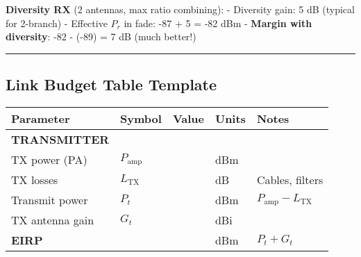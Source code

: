 \textbf{Diversity RX} (2 antennas, max ratio combining): - Diversity
gain: 5 dB (typical for 2-branch) - Effective \(P_r\) in fade: -87 + 5 =
-82 dBm - \textbf{Margin with diversity}: -82 - (-89) = 7 dB (much
better!)

\begin{center}\rule{0.5\linewidth}{0.5pt}\end{center}

\subsection{Link Budget Table
Template}\label{link-budget-table-template}

{\def\LTcaptype{} %
\begin{longtable}[]{@{}
  >{\raggedright\arraybackslash}p{}
  >{\raggedright\arraybackslash}p{}
  >{\raggedright\arraybackslash}p{}
  >{\raggedright\arraybackslash}p{}
  >{\raggedright\arraybackslash}p{}@{}}
\toprule\noalign{}
\begin{minipage}[b]{\linewidth}\raggedright
Parameter
\end{minipage} & \begin{minipage}[b]{\linewidth}\raggedright
Symbol
\end{minipage} & \begin{minipage}[b]{\linewidth}\raggedright
Value
\end{minipage} & \begin{minipage}[b]{\linewidth}\raggedright
Units
\end{minipage} & \begin{minipage}[b]{\linewidth}\raggedright
Notes
\end{minipage} \\
\midrule\noalign{}
\endhead
\bottomrule\noalign{}
\endlastfoot
\textbf{TRANSMITTER} & & & & \\
TX power (PA) & \(P_{\text{amp}}\) & & dBm & \\
TX losses & \(L_{\text{TX}}\) & & dB & Cables, filters \\
Transmit power & \(P_t\) & & dBm & \(P_{\text{amp}} - L_{\text{TX}}\) \\
TX antenna gain & \(G_t\) & & dBi & \\
\textbf{EIRP} & & & dBm & \(P_t + G_t\) \\

\end{longtable}}
